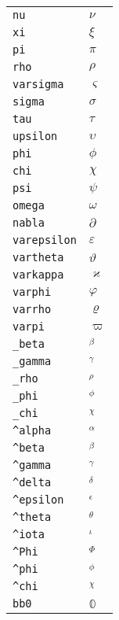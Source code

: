 \begin{longtable}{ll}
\texttt{nu}&${}\nu {}$\\
\texttt{xi}&${}\xi {}$\\
\texttt{pi}&${}\pi {}$\\
\texttt{rho}&${}\rho {}$\\
\texttt{varsigma}&${}\varsigma {}$\\
\texttt{sigma}&${}\sigma {}$\\
\texttt{tau}&${}\tau {}$\\
\texttt{upsilon}&${}\upsilon {}$\\
\texttt{phi}&${}\phi {}$\\
\texttt{chi}&${}\chi {}$\\
\texttt{psi}&${}\psi {}$\\
\texttt{omega}&${}\omega {}$\\
\texttt{nabla}&${}\partial {}$\\
\texttt{varepsilon}&${}\varepsilon {}$\\
\texttt{vartheta}&${}\vartheta {}$\\
\texttt{varkappa}&${}\varkappa {}$\\
\texttt{varphi}&${}\varphi {}$\\
\texttt{varrho}&${}\varrho {}$\\
\texttt{varpi}&${}\varpi {}$\\
\texttt{\_beta}&${}_\beta {}$\\
\texttt{\_gamma}&${}_\gamma {}$\\
\texttt{\_rho}&${}_\rho {}$\\
\texttt{\_phi}&${}_\phi {}$\\
\texttt{\_chi}&${}_\chi {}$\\
\texttt{\textasciicircum alpha}&${}^\alpha {}$\\
\texttt{\textasciicircum beta}&${}^\beta {}$\\
\texttt{\textasciicircum gamma}&${}^\gamma {}$\\
\texttt{\textasciicircum delta}&${}^\delta {}$\\
\texttt{\textasciicircum epsilon}&${}^\epsilon {}$\\
\texttt{\textasciicircum theta}&${}^\theta {}$\\
\texttt{\textasciicircum iota}&${}^\iota {}$\\
\texttt{\textasciicircum Phi}&${}^\Phi {}$\\
\texttt{\textasciicircum phi}&${}^\phi {}$\\
\texttt{\textasciicircum chi}&${}^\chi {}$\\
\texttt{bb0}&${}{\mathbb{0}}{}$\\

\end{longtable}

